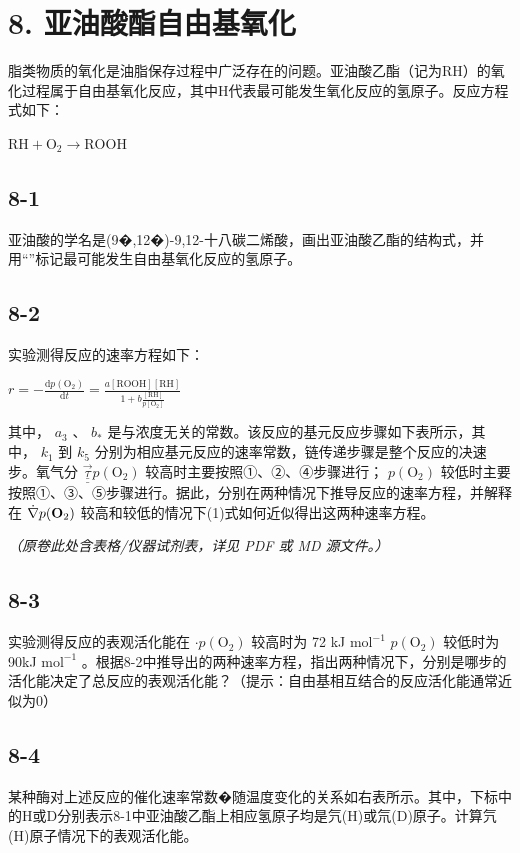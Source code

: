 \section*{8. 亚油酸酯自由基氧化}
脂类物质的氧化是油脂保存过程中⼴泛存在的问题。亚油酸⼄酯（记为RH）的氧化过程属于⾃由基氧化反应，其中H代表最可能发⽣氧化反应的氢原⼦。反应⽅程式如下：

$
\mathrm{RH} + \mathrm{O} _ {2} \rightarrow \mathrm{ROOH}
$

\subsection*{8-1}
亚油酸的学名是(9�,12�)-9,12-⼗⼋碳⼆烯酸，画出亚油酸⼄酯的结构式，并⽤“\*”标记最可能发⽣⾃由基氧化反应的氢原⼦。

\subsection*{8-2}
实验测得反应的速率⽅程如下：

$
r = - \frac {\mathrm{d} p (\mathrm{O} _ {2})}{\mathrm{d} t} = \frac {a [ \mathrm{ROOH} ] [ \mathrm{RH} ]}{1 + b \frac {[ \mathrm{RH} ]}{p [ \mathrm{O} _ {2} ]}}\tag{1}
$

其中， $a _ { \mathrm { \scriptscriptstyle 3 } }$ 、 $b _ { \scriptscriptstyle * }$ 是与浓度⽆关的常数。该反应的基元反应步骤如下表所⽰，其中， $k _ { 1 }$ 到 $k _ { 5 }$ 分别为相应基元反应的速率常数，链传递步骤是整个反应的决速步。氧⽓分 $\vec { \underline { { \underline { { \tau } } } } } p ( \mathrm { O } _ { 2 } )$ 较⾼时主要按照①、②、④步骤进⾏； $p ( \mathrm { O } _ { 2 } )$ 较低时主要按照①、③、⑤步骤进⾏。据此，分别在两种情况下推导反应的速率⽅程，并解释在 $\dot { \bf \nabla } p ( { \bf O } _ { 2 } )$ 较⾼和较低的情况下(1)式如何近似得出这两种速率⽅程。

\textit{（原卷此处含表格/仪器试剂表，详见 PDF 或 MD 源文件。）}

\subsection*{8-3}
实验测得反应的表观活化能在 $\cdot p ( \mathrm { O } _ { 2 } )$ 较⾼时为 72 kJ $\mathrm { m o l ^ { - 1 } }$ $p ( \mathrm { O } _ { 2 } )$ 较低时为 90kJ $\mathrm { m o l ^ { - 1 } }$ 。根据8-2中推导出的两种速率⽅程，指出两种情况下，分别是哪步的活化能决定了总反应的表观活化能？（提⽰：⾃由基相互结合的反应活化能通常近似为0）

\subsection*{8-4}
某种酶对上述反应的催化速率常数�随温度变化的关系如右表所⽰。其中，下标中的H或D分别表⽰8-1中亚油酸⼄酯上相应氢原⼦均是氕(H)或氘(D)原⼦。计算氕(H)原⼦情况下的表观活化能。

